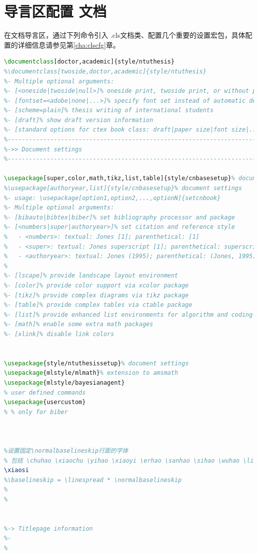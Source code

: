\section{导言区配置 \projectname 文档}
在文档导言区，通过下列命令引入 \projectname.cls文档类、配置几个重要的设置宏包，具体配置的详细信息请参见第\ref{cha:clscfg}章。
\begin{lstlisting}[language=tex]
\documentclass[doctor,academic]{style/ntuthesis}
%\documentclass[twoside,doctor,academic]{style/ntuthesis}
%- Multiple optional arguments:
%- [<oneside|twoside|null>]% oneside print, twoside print, or without print
%- [fontset=<adobe|none|...>]% specify font set instead of automatic detection
%- [scheme=plain]% thesis writing of international students
%- [draft]% show draft version information
%- [standard options for ctex book class: draft|paper size|font size|...]%
%---------------------------------------------------------------------------%
%->> Document settings
%---------------------------------------------------------------------------%

\usepackage[super,color,math,tikz,list,table]{style/cnbasesetup}% document settings
%\usepackage[authoryear,list]{style/cnbasesetup}% document settings
%- usage: \usepackage[option1,option2,...,optionN]{setcnbook}
%- Multiple optional arguments:
%- [bibauto|bibtex|biber]% set bibliography processor and package
%- [<numbers|super|authoryear>]% set citation and reference style
%   - <numbers>: textual: Jones [1]; parenthetical: [1]
%   - <super>: textual: Jones superscript [1]; parenthetical: superscript [1]
%   - <authoryear>: textual: Jones (1995); parenthetical: (Jones, 1995)
%
%- [lscape]% provide landscape layout environment
%- [color]% provide color support via xcolor package
%- [tikz]% provide complex diagrams via tikz package
%- [table]% provide complex tables via ctable package
%- [list]% provide enhanced list environments for algorithm and coding
%- [math]% enable some extra math packages
%- [xlink]% disable link colors


\usepackage{style/ntuthesissetup}% document settings
\usepackage{mlstyle/mlmath}% extension to amsmath
\usepackage{mlstyle/bayesianagent}
% user defined commands
\usepackage{usercustom}
% % only for biber



%设置固定\normalbaselineskip行距的字体
% 包括 \chuhao \xiaochu \yihao \xiaoyi \erhao \sanhao \sihao \wuhao \liuhao
\xiaosi
%\baselineskip = \linespread * \normalbaselineskip
%
%


%-> Titlepage information
%-
%
\end{lstlisting}

